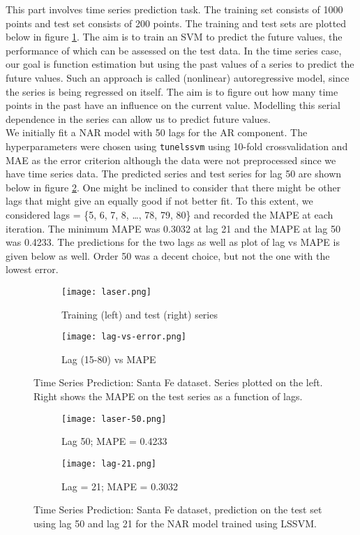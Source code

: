 \documentclass[paper=a4, fontsize=11pt]{scrartcl} %
\numberwithin{equation}{section} %
\begin{document}
This part involves time series prediction task. The training set consists of 1000 points and test set consists of 200 points. The training and test sets are plotted below in figure \ref{santafe}. The aim is to train an SVM to predict the future values, the performance of which can be assessed on the test data. In the time series case, our goal is function estimation but using the past values of a series to predict the future values. Such an approach is called (nonlinear) autoregressive model, since the series is being regressed on itself. The aim is to figure out how many time points in the past have an influence on the current value. Modelling this serial dependence in the series can allow us to predict future values.\\

 We initially fit a NAR model with 50 lags for the AR component. The hyperparameters were chosen using \texttt{tunelssvm} using 10-fold crossvalidation and MAE as the error criterion although the data were not preprocessed since we have time series data. The predicted series and test series for lag 50 are shown below in figure \ref{santafe-pred}. One might be inclined to consider that there might be other lags that might give an equally good if not better fit. To this extent, we considered lags = \{5, 6, 7, 8, \ldots, 78, 79, 80\} and recorded the MAPE at each iteration. The minimum MAPE was 0.3032 at lag 21 and the MAPE at lag 50 was 0.4233. The predictions for the two lags as well as plot of lag vs MAPE is given below as well. Order 50 was a decent choice, but not the one with the lowest error.

\begin{figure}[ht]
\centering
	\begin{subfigure}[b]{0.5\textwidth}
		\centering
		\texttt{[image: laser.png]}
		\caption{Training (left) and test (right) series}
	\end{subfigure}%
	\begin{subfigure}[b]{0.5\textwidth}
		\centering
		\texttt{[image: lag-vs-error.png]}
		\caption{Lag (15-80) vs MAPE}
	\end{subfigure}
\caption{Time Series Prediction: Santa Fe dataset. Series plotted on the left. Right shows the MAPE on the test series as a function of lags.}
\label{santafe}
\end{figure}

\begin{figure}[ht]
\centering
	\begin{subfigure}[b]{0.5\textwidth}
		\centering
		\texttt{[image: laser-50.png]}
		\caption{Lag 50; MAPE = 0.4233}
	\end{subfigure}%
	\begin{subfigure}[b]{0.5\textwidth}
		\centering
		\texttt{[image: lag-21.png]}
		\caption{Lag = 21; MAPE = 0.3032}
	\end{subfigure}
\caption{Time Series Prediction: Santa Fe dataset, prediction on the test set using lag 50 and lag 21 for the NAR model trained using LSSVM.}
\label{santafe-pred}
\end{figure}
\end{document}
